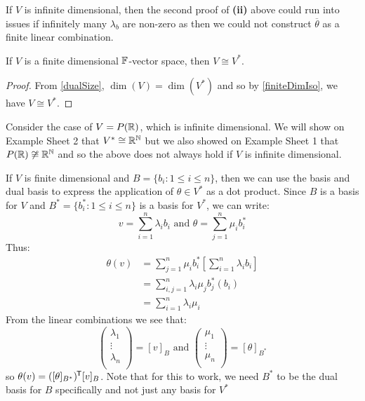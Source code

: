 \documentclass[../main.tex]{subfiles}
\begin{document}
\begin{remark}
  If $V$ is infinite dimensional, then the second proof of \textbf{(ii)} above could run into issues if infinitely many $\lambda_b$ are non-zero as then we could not construct $\overline{\theta}$ as a finite linear combination.
\end{remark}
\begin{corollary}
  If $V$ is a finite dimensional $\mathbb{F}$-vector space, then $V \cong V^{*}$.
\end{corollary}
\begin{proof}
  From \cref{dualSize}, $\dim(V) = \dim(V^{*})$ and so by \cref{finiteDimIso}, we have $V \cong V^{*}$.
\end{proof}
\begin{example}
  Consider the case of $V = P(\mathbb{R})$, which is infinite dimensional.
  We will show on Example Sheet 2 that $V^{*} \cong \mathbb{R}^{\mathbb{N}}$ but we also showed on Example Sheet 1 that $P(\R) \centernot\cong \R^\N$ and so the above does not always hold if $V$ is infinite dimensional.
\end{example}
If $V$ is finite dimensional and $B = \{b_i: 1 \leq i \leq n\}$, then we can use the basis and dual basis to express the application of $\theta \in V^{*}$ as a dot product.
Since $B$ is a basis for $V$ and $B^{*} = \{b^{*}_i: 1 \leq i \leq n\}$ is a basis for $V^{*}$, we can write:
\[
  v = \sum_{i = 1}^{n} \lambda_i b_i \text{ and } \theta = \sum_{j = 1}^{n} \mu_i b^{*}_i
\]
Thus:
\begin{align*}
  \theta(v) &= \sum_{j = 1}^{n} \mu_i b^{*}_i\left[\sum_{i = 1}^{n} \lambda_i b_i\right] \\
            &= \sum_{i, j = 1}^{n} \lambda_i \mu_j b^{*}_j(b_i) \\
            &= \sum_{i = 1}^{n} \lambda_i \mu_i
\end{align*}
From the linear combinations we see that:
\[
  \begin{pmatrix}
  \lambda_1 \\
  \vdots \\
  \lambda_n \\
  \end{pmatrix} = [v]_B \text{ and } \begin{pmatrix}
  \mu_1 \\
  \vdots \\
  \mu_n \\
  \end{pmatrix} = [\theta]_{B^{*}}
\]
so $\theta(v) = ([\theta]_{B^{*}})^{{\mkern-1.5mu\mathsf{T}}} [v]_{B}$.
Note that for this to work, we need $B^{*}$ to be the dual basis for $B$ specifically and not just any basis for $V^{*}$
\end{document}

